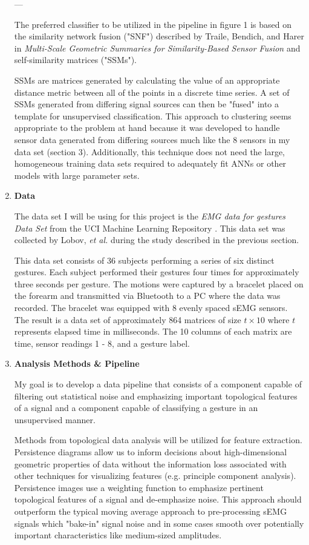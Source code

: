 \documentclass[11pt]{article}
\begin{document}
\begin{enumerate}
---

The preferred classifier to be utilized in the pipeline in figure 1 is based on the similarity network fusion ("SNF") described by Traile, Bendich, and Harer in \emph{Multi-Scale Geometric Summaries for Similarity-Based Sensor Fusion} \cite{ssm2} and self-similarity matrices ("SSMs").

SSMs are matrices generated by calculating the value of an appropriate distance metric between all of the points in a discrete time series. A set of SSMs generated from differing signal sources can then be "fused" into a template for unsupervised classification. This approach to clustering seems appropriate to the problem at hand because it was developed to handle sensor data generated from differing sources much like the 8 sensors in my data set (section 3). Additionally, this technique does not need the large, homogeneous training data sets required to adequately fit ANNs or other models with large parameter sets.

\item \textbf{Data}

The data set I will be using for this project is the \emph{EMG data for gestures Data Set} from the UCI Machine Learning Repository \cite{uci}. This data set was collected by Lobov, \emph{et al.} during the study described in the previous section.

This data set consists of 36 subjects performing a series of six distinct gestures. Each subject performed their gestures four times for approximately three seconds per gesture. The motions were captured by a bracelet placed on the forearm and transmitted via Bluetooth to a PC where the data was recorded. The bracelet was equipped with 8 evenly spaced sEMG sensors. The result is a data set of approximately 864 matrices of size $t \times 10$ where $t$ represents elapsed time in milliseconds. The 10 columns of each matrix are time, sensor readings 1 - 8, and a gesture label.

\item \textbf{Analysis Methods \& Pipeline}

My goal is to develop a data pipeline that consists of a component capable of filtering out statistical noise and emphasizing important topological features of a signal and a component capable of classifying a gesture in an unsupervised manner.

Methods from topological data analysis will be utilized for feature extraction. Persistence diagrams allow us to inform decisions about high-dimensional geometric properties of data without the information loss associated with other techniques for visualizing features (e.g. principle component analysis). Persistence images use a weighting function to emphasize pertinent topological features of a signal and de-emphasize noise. This approach should outperform the typical moving average approach \cite{state} to pre-processing sEMG signals which "bake-in" signal noise and in some cases smooth over potentially important characteristics like medium-sized amplitudes.


\end{enumerate}
\end{document}

